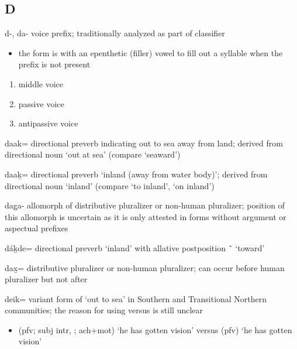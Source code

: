 \documentclass[12pt,letterpaper,oneside,article]{memoir}
\begin{document}
\subsection{D}\label{sec:alphalist-d}
\begin{morphdesc}[resume*=alphalist]
\item[d-, da-]
	voice prefix; traditionally analyzed as part of classifier
	\begin{itemize}
	\item	the  form is  with an epenthetic (filler) vowel 
		to fill out a syllable when the  prefix is not present
	\end{itemize}
	\begin{enumerate}
	\item	middle voice
	\item	passive voice
	\item	antipassive voice
	\end{enumerate}

\item[daak=]
	directional preverb indicating out to sea away from land;
	derived from directional noun  ‘out at sea’
		(compare  ‘seaward’)
\item[daaḵ=]
	directional preverb ‘inland (away from water body)’;
	derived from directional noun  ‘inland’
		(compare  ‘to inland’,  ‘on inland’)
\item[dag̱a-]
	allomorph of  distributive pluralizer or non-human pluralizer;
	position of this allomorph is uncertain as it is only attested in forms without
	argument or aspectual prefixes

\item[dáḵde=]
	directional preverb  ‘inland’ with allative postposition  \~\  ‘toward’

\item[dax̱=]
	distributive pluralizer or non-human pluralizer;
	can occur before human pluralizer  but not after

\item[deik=]
	variant form of  ‘out to sea’ in Southern and Transitional Northern communities;
	the reason for using  versus  is still unclear
	\begin{itemize}
	\item	{} (pfv; subj intr, ; ach+mot) ‘he has gotten vision’
		\parencite[06/212]{leer:1973}\newline
		versus  (pfv) ‘he has gotten vision’
	\end{itemize}


\end{morphdesc}
\end{document}
